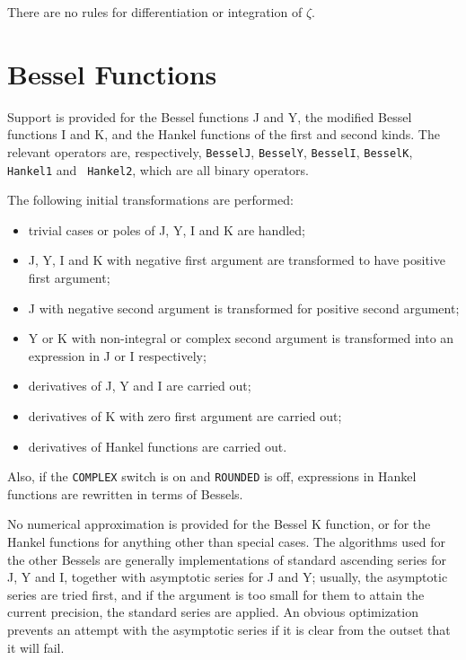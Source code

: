 There are no rules for differentiation or integration of $\zeta$.


\section{Bessel Functions}

Support is provided for the Bessel functions J and Y, the modified
Bessel functions I and K, and the Hankel functions of the first and
second kinds.  The relevant operators are, respectively, {\tt BesselJ},
{\tt BesselY}, {\tt BesselI}, {\tt BesselK}, {\tt Hankel1} and {\tt
Hankel2}, which are all binary operators.

The following initial transformations are performed:

\begin{itemize}
\item trivial cases or poles of J, Y, I and K are handled;
\item J, Y, I and K with negative first argument are transformed to have
positive first argument;
\item J with negative second argument is transformed for positive second
argument;
\item Y or K with non-integral or complex second argument is transformed
into an expression in J or I respectively;
\item derivatives of J, Y and I are carried out;
\item derivatives of K with zero first argument are carried out;
\item derivatives of Hankel functions are carried out.
\end{itemize}
Also, if the {\tt COMPLEX} switch is on and {\tt ROUNDED} is off,
expressions in Hankel functions are rewritten in terms of Bessels.

No numerical approximation is provided for the Bessel K function, or for
the Hankel functions for anything other than special cases.  The
algorithms used for the other Bessels are generally implementations of
standard ascending series for J, Y and I, together with asymptotic
series for J and Y; usually, the asymptotic series are tried first, and
if the argument is too small for them to attain the current precision,
the standard series are applied.  An obvious optimization prevents an
attempt with the asymptotic series if it is clear from the outset that
it will fail.

